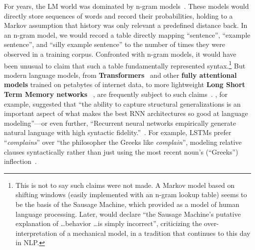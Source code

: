 For years, the LM world was dominated by n-gram models~\citep{shannon_mathematical_1948,rosenfeld_two_2000}. These models would directly store sequences of words and record their probabilities, holding to a Markov assumption that history was only relevant a predefined distance back. In an n-gram model, we would record a table directly mapping ``sentence'', ``example sentence'', and ``silly example sentence'' to the number of times they were observed in a training corpus. Confronted with n-gram models, it would have been unusual to claim that such a table fundamentally represented syntax.\footnote{This is not to say such claims were not made. A Markov model based on shifting windows (easily implemented with an n-gram lookup table) seems to be the basis of the Sausage Machine, which \citet{frazier_sausage_1978} provided as a model of human language processing. Later, \citet{wanner_atn_1980} would declare ``the Sausage Machine’s putative explanation of \ldots behavior \ldots is simply incorrect'', criticizing the over-interpretation of a mechanical model, in a tradition that continues to this day in NLP.} But modern language models, from \textbf{Transformers}~\citep{vaswani_attention_2017} and other \textbf{fully attentional models} \citep{brown_language_2020,liu2019roberta,Devlin2019BERTPO,yang_xlnet_2020} trained on petabytes of internet data, to more lightweight \textbf{Long Short Term Memory networks} ~\citep[LSTMs; ][]{hochreiter_long_1997}, 
are frequently subject to such claims~\citep{linzen_assessing_2016,lakretz_emergence_2019,kuncoro_lstms_2018,lu_influence_2020,vig_analyzing_2019,htut_attention_2019,vashishth_attention_2019,wiegreffe_attention_2019,clark_what_2019,voita_analyzing_2019,marecek_balustrades_2019}. 
\citet{gulordava_colorless_2018}, for example, suggested that ``the ability to capture structural generalizations is an important aspect of what makes the best RNN architectures so good at language modeling''---or even further, ``Recurrent neural networks empirically generate natural language with high syntactic fidelity.''~\citep{hewitt_rnns_2020}. For example, LSTMs prefer ``\textit{complains}'' over ``the philosopher the Greeks like \textit{complain}'', modeling relative clauses syntactically rather than just using the most recent noun's (``Greeks'') inflection~\citep{gulordava_colorless_2018}.
 
